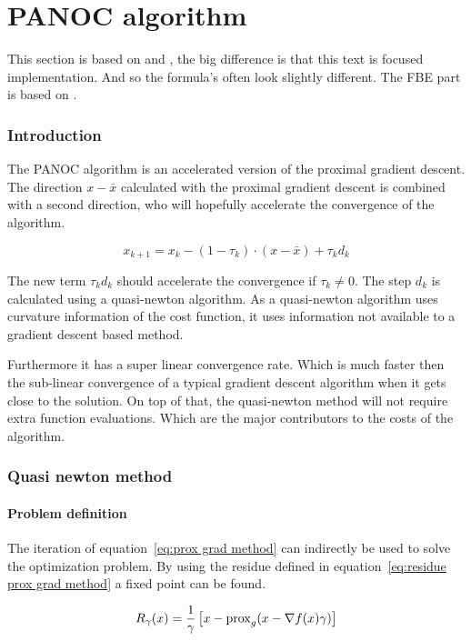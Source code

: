 \chapter{PANOC algorithm}
	This section is based on \cite{LorenzoStella2017} and \cite{AjaySathya2017}, the big difference is that this text is focused implementation. And so the formula's often look slightly different. The FBE part is based on \cite{Themelis}.
	\subsection{Introduction}
		The PANOC algorithm is an accelerated version of the proximal gradient descent. The direction  $x-\bar{x}$ calculated with the proximal gradient descent  is combined with a second direction, who will hopefully accelerate the convergence of the algorithm.
		
		\begin{equation}
		x_{k+1} = x_k - (1-\tau_k)\cdot (x-\bar{x}) + \tau_k d_k
		\end{equation}
		
		The new term $\tau_kd_k$ should accelerate the convergence if $\tau_k\neq0$. The step $d_k$ is calculated using a quasi-newton algorithm. As a quasi-newton algorithm uses curvature information of the cost function, it uses information not available to a gradient descent based method. 
		
		Furthermore it has a super linear convergence rate. Which is much faster then the sub-linear convergence of a typical gradient descent algorithm when it gets close to the solution. On top of that, the quasi-newton method will not require extra function evaluations. Which are the major contributors to the costs of the algorithm.
		
	\subsection{Quasi newton method}
		\subsubsection{Problem definition}
			The iteration of equation~\ref{eq:prox grad method} can indirectly be used to solve the optimization problem.  By using the residue defined in equation~\ref{eq:residue prox grad method} a fixed point can be found. 
			
			\begin{equation}
			R_{\gamma}(x)= \frac{1}{\gamma}\left[ x - \operatorname{prox}_g( x - \nabla f(x)\gamma) \right]
			\label{eq:residue prox grad method}
			\end{equation}
			
